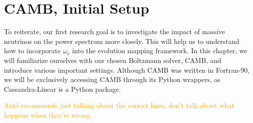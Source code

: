 \chapter{CAMB, Initial Setup}

To reiterate, our first research goal is to investigate the impact of massive
neutrinos on the power spectrum more closely. This will help us to understand
how to incorporate $\omega_\nu$ into the evolution mapping framework.
In this chapter, we will familiarize ourselves with our chosen Boltzmann 
solver, CAMB, and introduce various important settings. Although CAMB was
written in Fortran-90, we will be exclusively accessing CAMB through its
Python wrappers, as Cassandra-Linear is a Python package. 

\begin{comment}
\textcolor{blue}{
I hope to, in painstaking detail, cover many of the lines of the code that I
have written to interface with CAMB. I will include plots to indicate, at
every step, what incorrect settings cause the power spectrum to look like (or,
for subtler errors, what the error curves looked like compared to Ariel's
results, which I treated as a sort of ``ground truth''). This should also be a
good example to flex my physics interpretation skills: why does this incorrect
setting produce this undesired pattern?}

\textcolor{blue}{You might think that this is sort of an inappropriate 
section
for a master's thesis (especially since I have in mind that this be a lengthy 
section), but I would like to include it unless you feel very strongly. After
all, I spent several months of the project debugging at least ten different 
ways that slight and major errors in the various settings led to 
irreconcilable results.}
\end{comment}

\textcolor{orange}{Ariel recommends
just talking about the correct lines, don't talk about what happens when
they're wrong.}

\begin{comment}
In figure \ref{fig: spectrum_type}, we can see that requesting of the wrong
power spectrum type can in some low-$\omega_\nu$ cases yields errors so low
that we might accidentally overlook them. This error pattern is easily
recognizable and is a consequence of the definition of the power spectrum: the
Fourier transform  of the two-point correlation function. ...Okay, I'm still 
thinking about this. I don't understand %
\end{comment}

